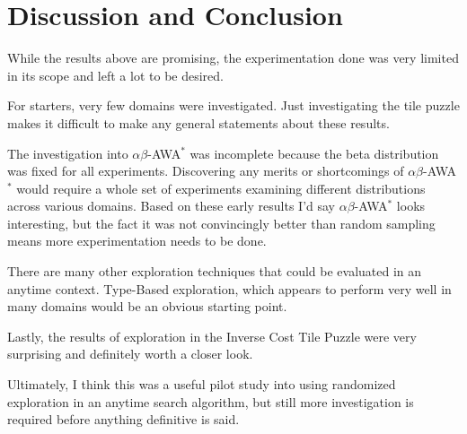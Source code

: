 \section{Discussion and Conclusion}
While the results above are promising, the experimentation done was very limited in its scope and left a lot to be desired. 

For starters, very few domains were investigated. Just investigating the tile puzzle makes it difficult to make any general statements about these results. 

The investigation into $\alpha \beta$-AWA$^*$ was incomplete because the beta distribution was fixed for all experiments. Discovering any merits or shortcomings of $\alpha \beta$-AWA$^*$ would require a whole set of experiments examining different distributions across various domains. Based on these early results I'd say $\alpha \beta$-AWA$^*$ looks interesting, but the fact it was not convincingly better than random sampling means more experimentation needs to be done. 

There are many other exploration techniques that could be evaluated in an anytime context. Type-Based exploration, which appears to perform very well in many domains would be an obvious starting point. 

Lastly, the results of exploration in the Inverse Cost Tile Puzzle were very surprising and definitely worth a closer look.  

Ultimately, I think this was a useful pilot study into using randomized exploration in an anytime search algorithm, but still more investigation is required before anything definitive is said.